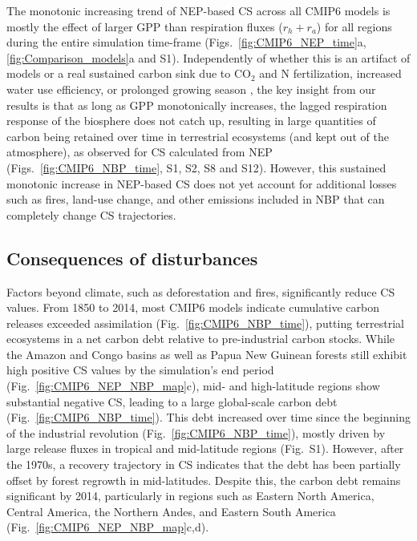 \documentclass[9pt,twocolumn,twoside]{pnas-new}
\begin{document}
The monotonic increasing trend of NEP-based CS across all CMIP6 models is mostly the effect of larger GPP than respiration fluxes ($r_h+r_a$) for all regions during the entire simulation time-frame (Figs.~\ref{fig:CMIP6_NEP_time}a, \ref{fig:Comparison_models}a  and S1). Independently of whether this is an artifact of models or a real sustained carbon sink due to CO$_2$ and N fertilization, increased water use efficiency, or prolonged growing season \cite{Fernandez-Martinez2017,Fernandez-Martinez2019,OSullivan2019,Friedlingstein2023,Ruehr2023}, the key insight from our results is that as long as GPP monotonically increases, the lagged respiration response of the biosphere does not catch up, resulting in large quantities of carbon being retained over time in terrestrial ecosystems (and kept out of the atmosphere), as observed for CS calculated from NEP (Figs.~\ref{fig:CMIP6_NBP_time}, S1, S2, S8 and S12). However, this sustained monotonic increase in NEP-based CS does not yet account for additional losses such as fires, land-use change, and other emissions included in NBP that can completely change CS trajectories.


\subsection*{Consequences of disturbances}
Factors beyond climate, such as deforestation and fires, significantly reduce CS values. From 1850 to 2014, most CMIP6 models indicate cumulative carbon releases exceeded assimilation (Fig.~\ref{fig:CMIP6_NBP_time}), putting terrestrial ecosystems in a net carbon debt relative to pre-industrial carbon stocks. While the Amazon and Congo basins as well as Papua New Guinean forests still exhibit high positive CS values by the simulation's end period (Fig.~\ref{fig:CMIP6_NEP_NBP_map}c), mid- and high-latitude regions show substantial negative CS, leading to a large global-scale carbon debt (Fig.~\ref{fig:CMIP6_NBP_time}). This debt increased over time since the beginning of the industrial revolution (Fig.~\ref{fig:CMIP6_NBP_time}), mostly driven by large release fluxes in tropical and mid-latitude regions (Fig.~S1). However, after the 1970s, a recovery trajectory in CS indicates that the debt has been partially offset by forest regrowth in mid-latitudes. Despite this, the carbon debt remains significant by 2014, particularly in regions such as Eastern North America, Central America, the Northern Andes, and Eastern South America (Fig.~\ref{fig:CMIP6_NEP_NBP_map}c,d). 
\end{document}
